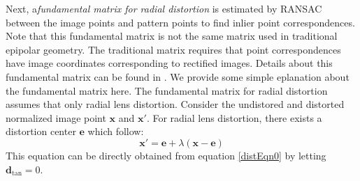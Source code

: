 \documentclass{report}
\begin{document}
Next, a\textit{fundamental matrix for radial distortion} is estimated by RANSAC between the image points and pattern points to find inlier point correspondences. Note that this fundamental matrix is not the same matrix used in traditional epipolar geometry. The traditional matrix requires that point correspondences have image coordinates corresponding to rectified images. Details about this fundamental matrix can be found in \cite{hartley2007parameter}. We provide some simple eplanation about the fundamental matrix here. The fundamental matrix for radial distortion assumes that only radial lens distortion. Consider the undistored and distorted normalized image point $\mathbf{x}$ and $\mathbf{x}'$. For radial lens distortion, there exists a distortion center $\mathbf{e}$ which follow: 
\begin{equation}
\mathbf{x}' = \mathbf{e} + \lambda (\mathbf{x} - \mathbf{e})
\end{equation}
This equation can be directly obtained from equation \ref{distEqn0} by letting $\mathbf{d}_\text{tan} = 0$. 
\end{document}
